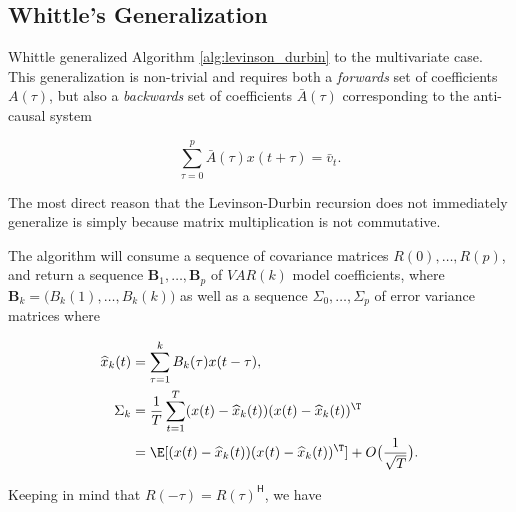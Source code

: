 \documentclass[12pt]{article}
\begin{document}
\subsection{Whittle's Generalization}
Whittle \cite{whittle_generalized_levinson_durbin} generalized
Algorithm \ref{alg:levinson_durbin} to the multivariate case.  This
generalization is non-trivial and requires both a \textit{forwards}
set of coefficients $A(\tau)$, but also a \textit{backwards} set of
coefficients $\bar{A}(\tau)$ corresponding to the anti-causal system

\begin{equation}
  \sum_{\tau = 0}^p\bar{A}(\tau)x(t + \tau) = \bar{v}_t.
\end{equation}

The most direct reason that the Levinson-Durbin recursion does not
immediately generalize is simply because matrix multiplication is not
commutative.

The algorithm will consume a sequence of covariance matrices
$R(0), \ldots, R(p)$, and return a sequence
$\mathbf{B}_1, \ldots, \mathbf{B}_p$ of $VAR(k)$ model coefficients,
where $\mathbf{B}_k = \big(B_k(1), \ldots, B_k(k) \big)$ as well as a
sequence $\Sigma_0, \ldots, \Sigma_p$ of error variance matrices where

\begin{equation}
  \begin{aligned}
    \widehat{x}_k(t) &= \sum_{\tau = 1}^k B_k(\tau)x(t - \tau),\\
    \Sigma_k &= \frac{1}{T} \sum_{t = 1}^T (x(t) - \widehat{x}_k(t))(x(t) - \widehat{x}_k(t))^\T\\
    &= \E[(x(t) - \widehat{x}_k(t))(x(t) - \widehat{x}_k(t))^\T] + O\big(\frac{1}{\sqrt{T}}\big).
  \end{aligned}
\end{equation}

Keeping in mind that $R(-\tau) = R(\tau)^{\mathsf{H}}$, we have
\end{document}
